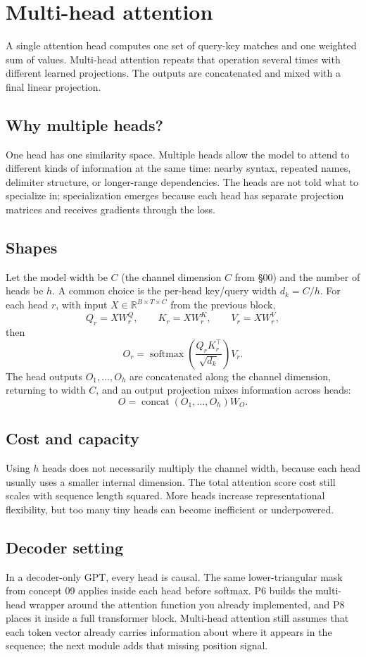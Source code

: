 \section{Multi-head attention}\label{sec:10}

A single attention head computes one set of query-key matches and one weighted
sum of values. Multi-head attention repeats that operation several times with
different learned projections. The outputs are concatenated and mixed with a
final linear projection.

\subsection*{Why multiple heads?}
One head has one similarity space. Multiple heads allow the model to attend to
different kinds of information at the same time: nearby syntax, repeated names,
delimiter structure, or longer-range dependencies. The heads are not told what
to specialize in; specialization emerges because each head has separate
projection matrices and receives gradients through the loss.

\subsection*{Shapes}
Let the model width be $C$ (the channel dimension $C$ from \S00) and the
number of heads be $h$. A common choice is the per-head key/query width
$d_k = C/h$. For each head $r$, with input $X \in \mathbb{R}^{B \times T \times C}$
from the previous block,
\[
  Q_r = XW^Q_r,\qquad K_r = XW^K_r,\qquad V_r = XW^V_r,
\]
then
\[
  O_r = \operatorname{softmax}\left(\frac{Q_rK_r^\top}{\sqrt{d_k}}\right)V_r.
\]
The head outputs $O_1,\dots,O_h$ are concatenated along the channel dimension,
returning to width $C$, and an output projection mixes information across heads:
\[
  O = \operatorname{concat}(O_1,\dots,O_h)W_O.
\]

\subsection*{Cost and capacity}
Using $h$ heads does not necessarily multiply the channel width, because each
head usually uses a smaller internal dimension. The total attention score cost
still scales with sequence length squared. More heads increase representational
flexibility, but too many tiny heads can become inefficient or underpowered.

\subsection*{Decoder setting}
In a decoder-only GPT, every head is causal. The same lower-triangular mask from
concept 09 applies inside each head before softmax. P6 builds the multi-head
wrapper around the attention function you already implemented, and P8 places it
inside a full transformer block. Multi-head attention still assumes that each
token vector already carries information about where it appears in the sequence;
the next module adds that missing position signal.
